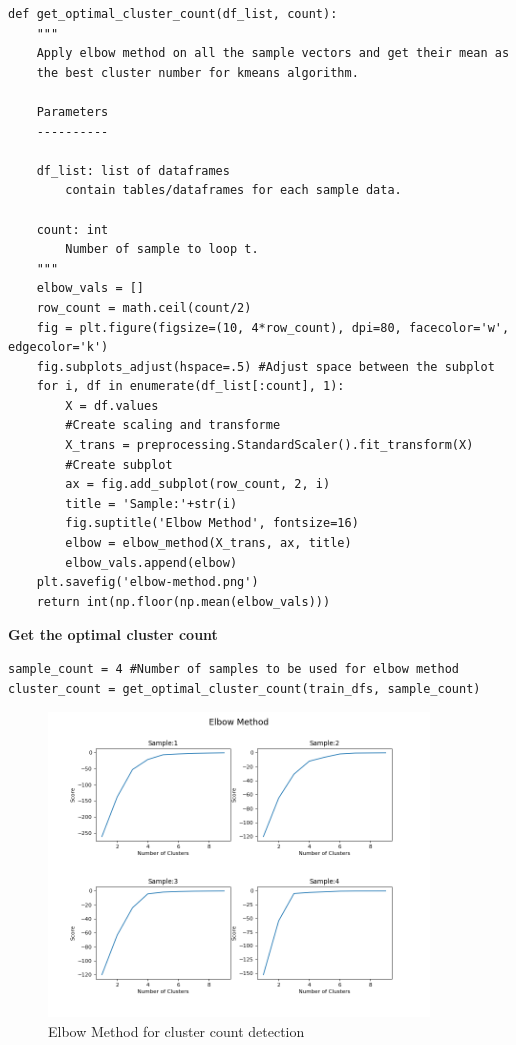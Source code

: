 \documentclass{article}
\begin{document}
\begin{verbatim}
def get_optimal_cluster_count(df_list, count):
    """
    Apply elbow method on all the sample vectors and get their mean as
    the best cluster number for kmeans algorithm.

    Parameters
    ----------

    df_list: list of dataframes
        contain tables/dataframes for each sample data.

    count: int
        Number of sample to loop t.
    """
    elbow_vals = []
    row_count = math.ceil(count/2)
    fig = plt.figure(figsize=(10, 4*row_count), dpi=80, facecolor='w', edgecolor='k')
    fig.subplots_adjust(hspace=.5) #Adjust space between the subplot
    for i, df in enumerate(df_list[:count], 1):
        X = df.values
        #Create scaling and transforme
        X_trans = preprocessing.StandardScaler().fit_transform(X)
        #Create subplot
        ax = fig.add_subplot(row_count, 2, i)
        title = 'Sample:'+str(i)
        fig.suptitle('Elbow Method', fontsize=16)
        elbow = elbow_method(X_trans, ax, title)
        elbow_vals.append(elbow)
    plt.savefig('elbow-method.png')
    return int(np.floor(np.mean(elbow_vals)))
\end{verbatim}
\textbf{Get the optimal cluster count}
\begin{verbatim}
sample_count = 4 #Number of samples to be used for elbow method
cluster_count = get_optimal_cluster_count(train_dfs, sample_count)
\end{verbatim}

\begin{figure}[H]
\centering
\includegraphics[width=0.90\textwidth]{elbow-method.png}
\caption{Elbow Method for cluster count detection} \label{fig:elbow-method-in-program}
\end{figure}
\end{document}
